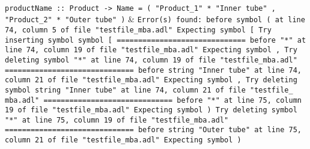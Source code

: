 \\\hline
\texttt{productName :: Product -> Name\newline
    = ( "Product\_1" * "Inner tube"\newline
      , "Product\_2" * "Outer tube"\newline
      )} & \texttt{Error(s) found:\newline
  \newline
  before symbol ( at line 74, column 5 of file "testfile\_mba.adl"\newline
  Expecting symbol [\newline
  Try inserting symbol symbol [\newline
  \newline
  ==============================\newline
  \newline
  before "*" at line 74, column 19 of file "testfile\_mba.adl"\newline
  Expecting symbol ,\newline
  Try deleting symbol "*" at line 74, column 19 of file "testfile\_mba.adl"\newline
  \newline
  ==============================\newline
  \newline
  before string "Inner tube" at line 74, column 21 of file "testfile\_mba.adl"\newline
  Expecting symbol ,\newline
  Try deleting symbol string "Inner tube" at line 74, column 21 of file "testfile\_\newline
  mba.adl"\newline
  \newline
  ==============================\newline
  \newline
  before "*" at line 75, column 19 of file "testfile\_mba.adl"\newline
  Expecting symbol )\newline
  Try deleting symbol "*" at line 75, column 19 of file "testfile\_mba.adl"\newline
  \newline
  ==============================\newline
  \newline
  before string "Outer tube" at line 75, column 21 of file "testfile\_mba.adl"\newline
  Expecting symbol )\newline
}
